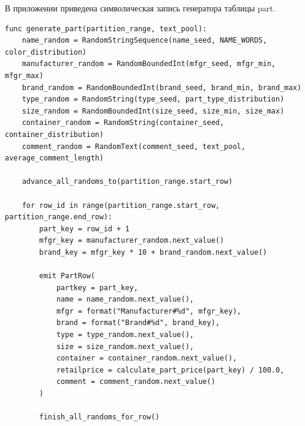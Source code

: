 \setcounter{appendixlstbase}{\value{lstlisting}}
\renewcommand{\thelstlisting}{\Asbuk{appendicesnum}.\number\numexpr\value{lstlisting}-\value{appendixlstbase}\relax}
\label{appendix:part}

В приложении приведена символическая запись генератора таблицы
part.

\begin{lstlisting}[style=reportpseudocode,caption={Формирование таблицы part},label={lst:app-part}]
func generate_part(partition_range, text_pool):
    name_random = RandomStringSequence(name_seed, NAME_WORDS, color_distribution)
    manufacturer_random = RandomBoundedInt(mfgr_seed, mfgr_min, mfgr_max)
    brand_random = RandomBoundedInt(brand_seed, brand_min, brand_max)
    type_random = RandomString(type_seed, part_type_distribution)
    size_random = RandomBoundedInt(size_seed, size_min, size_max)
    container_random = RandomString(container_seed, container_distribution)
    comment_random = RandomText(comment_seed, text_pool, average_comment_length)

    advance_all_randoms_to(partition_range.start_row)

    for row_id in range(partition_range.start_row, partition_range.end_row):
        part_key = row_id + 1
        mfgr_key = manufacturer_random.next_value()
        brand_key = mfgr_key * 10 + brand_random.next_value()

        emit PartRow(
            partkey = part_key,
            name = name_random.next_value(),
            mfgr = format("Manufacturer#%d", mfgr_key),
            brand = format("Brand#%d", brand_key),
            type = type_random.next_value(),
            size = size_random.next_value(),
            container = container_random.next_value(),
            retailprice = calculate_part_price(part_key) / 100.0,
            comment = comment_random.next_value()
        )

        finish_all_randoms_for_row()
\end{lstlisting}
